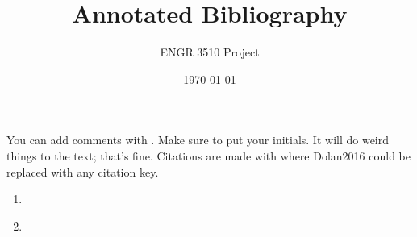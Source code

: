 \documentclass[12pt,letterpaper]{article}
\begin{document}
\title{Annotated Bibliography}
\author{ENGR 3510 Project}
\date{\today}
\maketitle

You can add comments with . Make sure to put your initials. It will do weird things to the text; that's fine. 
Citations are made with \cite{Dolan2016} where Dolan2016 could be replaced with any citation key. 


\begin{enumerate}
	\item \cite{Dolan2016}  
	\item \cite{J.EllisBell2015}  
\end{enumerate}

\printbibliography
\end{document}
